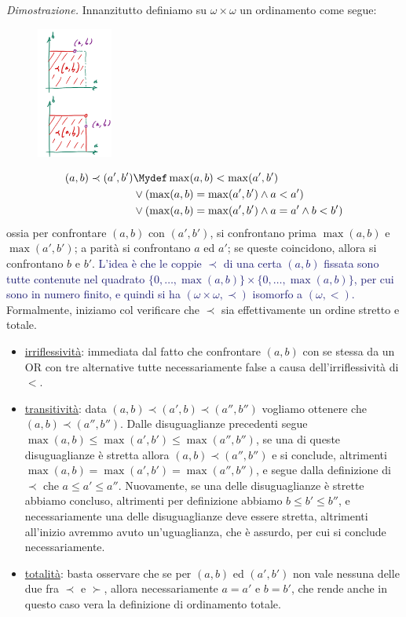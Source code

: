\newpage
\hspace{-0.43cm}\emph{Dimostrazione.}\hspace{-0.20cm} Innanzitutto definiamo su $\omega \times \omega$ un ordinamento come segue:
	\begin{figure}
		\includegraphics[width=2.5cm]{immagini/ordine_omega.png}
	\end{figure}
	\[ \begin{split}
		(a,b) \prec (a',b') &\Mydef \max(a,b) < \max(a',b') \\
							&\lor (\max(a,b) = \max(a',b') \land a < a') \\
							&\lor (\max(a,b) = \max(a',b') \land a = a' \land b < b')
	\end{split}
		\]
	ossia per confrontare $(a,b)$ con $(a',b')$, si confrontano prima $\max(a,b)$ e $\max(a',b')$; a parità si confrontano $a$ ed $a'$; se queste coincidono, allora si confrontano $b$ e $b'$.
	\textcolor{MidnightBlue}{L'idea è che le coppie $\prec$ di una certa $(a,b)$ fissata sono tutte contenute nel quadrato $\{0,\ldots,\max(a,b)\} \times \{0,\ldots,\max(a,b)\}$, per cui sono in numero finito, e quindi si ha $(\omega \times \omega, \prec)$ isomorfo a $(\omega,<)$.}\\
	Formalmente, iniziamo col verificare che $\prec$ sia effettivamente un ordine stretto e totale.
	\begin{itemize}
		\item \underline{irriflessività}: immediata dal fatto che confrontare $(a,b)$ con se stessa da un OR con tre alternative tutte necessariamente false a causa dell'irriflessività di $<$.
		\item \underline{transitività}: data $(a,b) \prec (a',b) \prec (a'',b'')$ vogliamo ottenere che $(a,b) \prec (a'',b'')$. Dalle disuguaglianze precedenti segue $\max(a,b) \leq \max(a',b') \leq \max(a'',b'')$, se una di queste disuguaglianze è stretta allora $(a,b) \prec (a'',b'')$ e si conclude,
		altrimenti $\max(a,b) = \max(a',b') = \max(a'',b'')$, e segue dalla definizione di $\prec$ che $a \leq a' \leq a''$. Nuovamente, se una delle disuguaglianze è strette abbiamo concluso, altrimenti per definizione abbiamo $b \leq b' \leq b''$, e necessariamente una delle disuguaglianze deve essere stretta,
		altrimenti all'inizio avremmo avuto un'uguaglianza, che è assurdo, per cui si conclude necessariamente.
		\item \underline{totalità}: basta osservare che se per $(a,b)$ ed $(a',b')$ non vale nessuna delle due fra $\prec$ e $\succ$, allora necessariamente $a = a'$ e $b = b'$, che rende anche in questo caso vera la definizione di ordinamento totale.
	\end{itemize}
